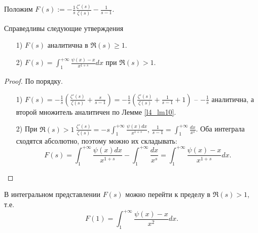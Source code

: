 Положим $\displaystyle F(s) := -\frac{1}{s}\frac{\zeta'(s)}{\zeta(s)} - \frac{1}{s-1}$.\\
\begin{lemma} \label{l2_lm11}
	Справедливы следующие утверждения
	\begin{enumerate}
		\item[1)] $F(s)$ аналитична в $\Re(s) \geq 1$.
		\item[2)] $\displaystyle F(s) = \int_1^{+\infty} \frac{\psi(x)-x}{x^{1+s}}dx$ при $\Re(s) > 1$.
	\end{enumerate}
\end{lemma}
\begin{proof}
	По порядку.
	\begin{enumerate}
		\item[1)] $\displaystyle F(s) = -\frac{1}{s}\left( \frac{\zeta'(s)}{\zeta(s)} + \frac{s}{s-1} \right) = -\frac{1}{s}\left( \frac{\zeta'(s)}{\zeta(s)} + \frac{1}{s-1} +1 \right)$ -- $\displaystyle -\frac{1}{s}$ аналитична, а второй множитель аналитичен по Лемме \ref{l4_lm10}.
		\item[2)] При $\displaystyle \Re(s)>1 \ \frac{\zeta'(s)}{\zeta(s)} = -s\int_1^{+\infty} \frac{\psi(x)dx}{x^{1+s}}, \, \frac{1}{s-1}=\int_1^{+\infty}\frac{dx}{x^s}$. Оба интеграла сходятся абсолютно, поэтому можно их складывать:
			$$F(s) = \int_1^{+\infty}\frac{\psi(x)dx}{x^{1+s}} - \int_1^{+\infty} \frac{dx}{x^s} = \int_1^{+\infty} \frac{\psi(x)-x}{x^{1+s}}dx.$$
	\end{enumerate}
\end{proof}

\begin{theorem} \label{l4_thm7}
	В интегральном представлении $F(s)$ можно перейти к пределу в $\Re(s)>1$, т.е.
	$$F(1) = \int_1^{+\infty} \frac{\psi(x)-x}{x^2}dx.$$
\end{theorem}


